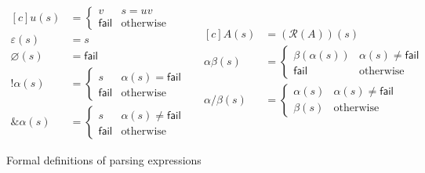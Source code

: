 \documentclass{article}
\newcommand{\Rule}{\mathcal{R}}
\newcommand{\fail}{\mathsf{fail}}
\newcommand{\nl}{\mathord{!}}
\begin{document}
\begin{figure}
	\centering
	\begin{equation*}
	\begin{aligned}[c]
	u(s)            & = \begin{cases} v     & s = uv \\
	                                  \fail & \text{otherwise} \end{cases} \\
	\varepsilon(s)  & = s \\
	\varnothing(s)  & = \fail \\
	\nl\alpha(s)    & = \begin{cases} s     & \alpha(s) = \fail \\
	                                  \fail & \text{otherwise} \end{cases} \\
    \&\alpha(s)     & = \begin{cases} s     & \alpha(s) \neq \fail \\
                                      \fail & \text{otherwise} \end{cases}
	\end{aligned}
	~~~~
	\begin{aligned}[c]
	A(s)            & = (\Rule(A))(s) \\
	\alpha\beta(s)  & = \begin{cases} \beta(\alpha(s)) & \alpha(s) \neq \fail \\
	                                  \fail            & \text{otherwise} \end{cases} \\
	\alpha/\beta(s) & = \begin{cases} \alpha(s)  & \alpha(s) \neq \fail \\
	                                  \beta(s)   & \text{otherwise} \end{cases}
	\end{aligned}
	\end{equation*}
	\caption[Expression definitions]{Formal definitions of parsing expressions} \label{expr-fig}
\end{figure}
\end{document}
